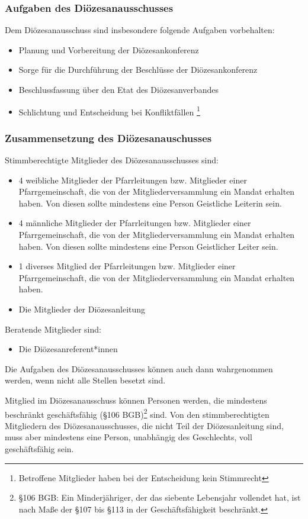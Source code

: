 \documentclass[12pt]{report}
\begin{document}
\begin{flushleft}
\subsubsection{Aufgaben des Diözesanausschusses}
Dem Diözesanausschuss sind insbesondere folgende Aufgaben vorbehalten:
\begin{itemize}
  \item Planung und Vorbereitung der Diözesankonferenz
  \item Sorge für die Durchführung der Beschlüsse der Diözesankonferenz
  \item Beschlussfassung über den Etat des Diözesanverbandes
  \item Schlichtung und Entscheidung bei Konfliktfällen
        \footnote{Betroffene Mitglieder haben bei der Entscheidung kein Stimmrecht}
\end{itemize}

\subsubsection{Zusammensetzung des Diözesanauschusses}
Stimmberechtigte Mitglieder des Diözesanausschusses sind:
\begin{itemize}
  \item 4 weibliche Mitglieder der Pfarrleitungen bzw. Mitglieder einer Pfarrgemeinschaft, die von der
        Mitgliederversammlung ein Mandat erhalten haben. Von diesen sollte mindestens eine Person
        Geistliche Leiterin sein.
  \item 4 männliche Mitglieder der Pfarrleitungen bzw. Mitglieder einer Pfarrgemeinschaft, die von
        der Mitgliederversammlung ein Mandat erhalten haben. Von diesen sollte mindestens eine
        Person Geistlicher Leiter sein.
  \item 1 diverses Mitglied der Pfarrleitungen bzw. Mitglieder einer Pfarrgemeinschaft, die von
        der Mitgliederversammlung ein Mandat erhalten haben.
  \item Die Mitglieder der Diözesanleitung
\end{itemize}

Beratende Mitglieder sind:
\begin{itemize}
  \item Die Diözesanreferent*innen
\end{itemize}

Die Aufgaben des Diözesanausschusses können auch dann wahrgenommen werden, wenn nicht
alle Stellen besetzt sind.

Mitglied im Diözesanausschuss können Personen werden, die mindestens beschränkt geschäftsfähig (§106 BGB)\footnote{§106 BGB: Ein Minderjähriger, der das siebente Lebensjahr vollendet hat, ist nach Maße der §107 bis §113 in
der Geschäftsfähigkeit beschränkt.} sind.
Von den stimmberechtigten Mitgliedern des Diözesanausschusses, die nicht Teil der Diözesanleitung sind,
muss aber mindestens eine Person, unabhängig des Geschlechts, voll geschäftsfähig sein.


\end{flushleft}
\end{document}
